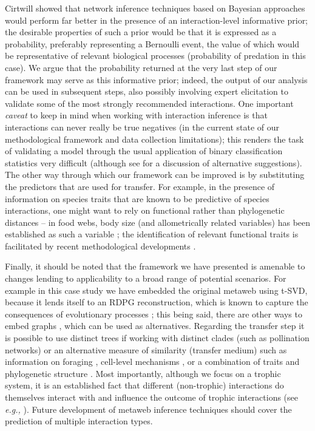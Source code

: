 Cirtwill \cite{Cirtwill2019QuaFra} showed that network inference techniques based on
Bayesian approaches would perform far better in the presence of an
interaction-level informative prior; the desirable properties of such a
prior would be that it is expressed as a probability, preferably
representing a Bernoulli event, the value of which would be
representative of relevant biological processes (probability of
predation in this case). We argue that the probability returned at the
very last step of our framework may serve as this informative prior;
indeed, the output of our analysis can be used in subsequent steps, also
possibly involving expert elicitation to validate some of the most
strongly recommended interactions. One important \emph{caveat} to keep
in mind when working with interaction inference is that interactions can
never really be true negatives (in the current state of our
methodological framework and data collection limitations); this renders
the task of validating a model through the usual application of binary
classification statistics very difficult (although see
\cite{Strydom2021RoaPre} for a discussion of alternative suggestions). The
other way through which our framework can be improved is by substituting
the predictors that are used for transfer. For example, in the presence
of information on species traits that are known to be predictive of
species interactions, one might want to rely on functional rather than
phylogenetic distances -- in food webs, body size (and allometrically
related variables) has been established as such a variable
\cite{Brose2006ConRes}; the identification of relevant functional traits
is facilitated by recent methodological developments
\cite{Rosado2013GoiBac}.

Finally, it should be noted that the framework we have presented is
amenable to changes lending to applicability to a broad range of
potential scenarios. For example in this case study we have embedded the
original metaweb using t-SVD, because it lends itself to an RDPG
reconstruction, which is known to capture the consequences of
evolutionary processes \cite{DallaRiva2016ExpEvo}; this being said,
there are other ways to embed graphs \cite{Arsov2019NetEmb,
Cai2017ComSur, Cao2019NetEmb}, which can be used as alternatives.
Regarding the transfer step it is possible to use distinct trees if
working with distinct clades (such as pollination networks) or an
alternative measure of similarity (transfer medium) such as information
on foraging \cite{Beckerman2006ForBio}, cell-level mechanisms
\cite{Boeckaerts2021PreBac}, or a combination of traits and phylogenetic
structure \cite{Stock2021PaiLea}. Most importantly, although we focus on
a trophic system, it is an established fact that different (non-trophic)
interactions do themselves interact with and influence the outcome of
trophic interactions (see \emph{e.g.,} \cite{Kawatsu2021AreNet,
Kefi2012MorMea}). Future development of metaweb inference techniques
should cover the prediction of multiple interaction types.

